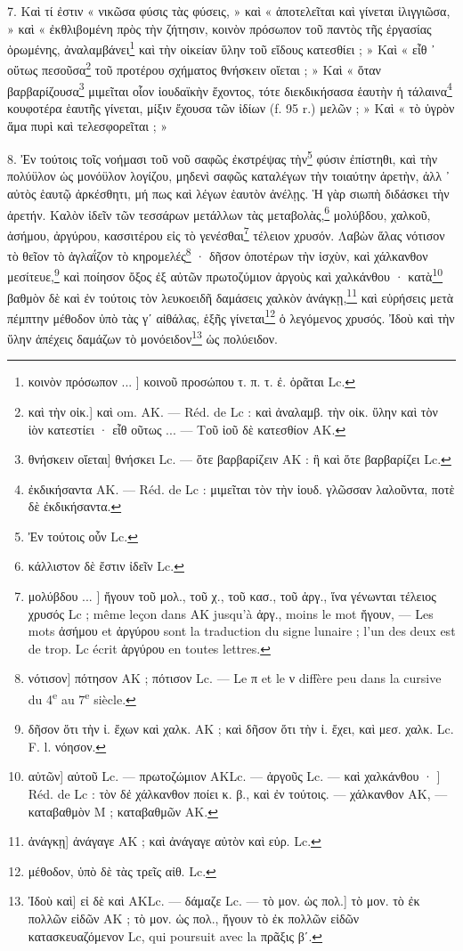 \documentclass[a4paper, 11pt, oneside, polutonikogreek, french]{article}
\begin{document}
7. Καὶ τί ἐστιν « νικῶσα φύσις τὰς φύσεις, » καὶ « ἀποτελεῖται καὶ γίνεται ἰλιγγιῶσα, » καὶ « ἐκθλιβομένη πρὸς τὴν ζήτησιν, κοινὸν πρόσωπον τοῦ παντὸς τῆς ἐργασίας ὁρωμένης, ἀναλαμβάνει\footnote{κοινὸν πρόσωπον ... ] κοινοῦ προσώπου τ. π. τ. ἐ. ὁρᾶται Lc.} καὶ τὴν οἰκείαν ὕλην τοῦ εἴδους κατεσθίει ; » Καὶ « εἶθ ᾽ οὕτως πεσοῦσα\footnote{καὶ τὴν οἰκ.] καὶ om. AK. --- Réd. de Lc : καὶ ἀναλαμβ. τὴν οἰκ. ὕλην καὶ τὸν ἰὸν κατεστίει · εἶθ οῦτως ... --- Τοῦ ἰοῦ δὲ κατεσθίον AK.} τοῦ προτέρου σχήματος θνήσκειν οἴεται ; » Καὶ « ὅταν βαρβαρίζουσα\footnote{θνήσκειν οἴεται] θνήσκει Lc. --- ὅτε βαρβαρίζειν AK : ἣ καὶ ὅτε βαρβαρίζει Lc.} μιμεῖται οἷον ἰουδαϊκὴν ἔχοντος, τότε διεκδικήσασα ἑαυτὴν ἡ τάλαινα\footnote{ἐκδικήσαντα AK. --- Réd. de Lc : μιμεῖται τὸν τὴν ἰουδ. γλῶσσαν λαλοῦντα, ποτὲ δὲ ἐκδικήσαντα.} κουφοτέρα ἑαυτῆς γίνεται, μίξιν ἔχουσα τῶν ἰδίων (f. 95 r.) μελῶν ; » Καὶ « τὸ ὑγρὸν ἅμα πυρὶ καὶ τελεσφορεῖται ; »

8. Ἐν τούτοις τοῖς νοήμασι τοῦ νοῦ σαφῶς ἐκστρέψας τὴν\footnote{Ἐν τούτοις οὗν Lc.} φύσιν ἐπίστηθι, καὶ τὴν πολύϋλον ὡς μονόϋλον λογίζου, μηδενὶ σαφῶς καταλέγων τὴν τοιαύτην ἀρετὴν, ἀλλ ᾽ αὐτὸς ἑαυτῷ ἀρκέσθητι, μή πως καὶ λέγων ἑαυτὸν ἀνέλῃς. Ἡ γὰρ σιωπὴ διδάσκει τὴν ἀρετήν. Καλὸν ἰδεῖν τῶν τεσσάρων μετάλλων τὰς μεταβολὰς,\footnote{κάλλιστον δὲ ἔστιν ἰδεῖν Lc.} μολύβδου, χαλκοῦ, ἀσήμου, ἀργύρου, κασσιτέρου εἰς τὸ γενέσθαι\footnote{μολύβδου ... ] ἤγουν τοῦ μολ., τοῦ χ., τοῦ κασ., τοῦ ἀργ., ἵνα γένωνται τέλειος χρυσός Lc ; même leçon dans AK jusqu'à ἀργ., moins le mot ἤγουν, --- Les mots ἀσήμου et ἀργύρου sont la traduction du signe lunaire ; l'un des deux est de trop. Lc écrit ἀργύρου en toutes lettres.} τέλειον χρυσόν. Λαβὼν ἅλας νότισον τὸ θεῖον τὸ ἀγλαΐζον τὸ κηρομελές\footnote{νότισον] πότησον AK ; πότισον Lc. --- Le π et le ν diffère peu dans la cursive du 4\textsuperscript{e} au 7\textsuperscript{e} siècle.} · δῆσον ὁποτέρων τὴν ἰσχὺν, καὶ χάλκανθον μεσίτευε,\footnote{δῆσον ὅτι τὴν ἰ. ἔχων καὶ χαλκ. AK ; καὶ δῆσον ὅτι τὴν ἰ. ἔχει, καὶ μεσ. χαλκ. Lc. F. l. νόησον.} καὶ ποίησον ὄξος ἐξ αὐτῶν πρωτοζύμιον ἀργοὺς καὶ χαλκάνθου · κατὰ\footnote{αὐτῶν] αὐτοῦ Lc. --- πρωτοζώμιον AKLc. --- ἀργοῦς Lc. --- καὶ χαλκάνθου · ] Réd. de Lc : τὸν δἐ χάλκανθον ποίει κ. β., καὶ ἐν τούτοις. --- χάλκανθον AK, --- καταβαθμὸν M ; καταβαθμῶν AK.} βαθμὸν δὲ καὶ ἐν τούτοις τὸν λευκοειδῆ δαμάσεις χαλκὸν ἀνάγκῃ,\footnote{ἀνάγκῃ] ἀνάγαγε AK ; καὶ ἀνάγαγε αὐτὸν καὶ εὑρ. Lc.} καὶ εὑρήσεις μετὰ πέμπτην μέθοδον ὑπὸ τὰς γʹ αἰθάλας, ἑξῆς γίνεται\footnote{μέθοδον, ὑπὸ δὲ τὰς τρεῖς αἰθ. Lc.} ὁ λεγόμενος χρυσός. Ἰδοὺ καὶ τὴν ὕλην ἀπέχεις δαμάζων τὸ μονόειδον\footnote{Ἰδοὺ καὶ] εἰ δὲ καὶ AKLc. --- δάμαζε Lc. --- τὸ μον. ὡς πολ.] τὸ μον. τὸ ἐκ πολλῶν εἰδῶν AK ; τὸ μον. ὡς πολ., ἤγουν τὸ ἐκ πολλῶν εἰδῶν κατασκευαζόμενον Lc, qui poursuit avec la πρᾶξις βʹ.} ὡς πολύειδον.
\end{document}
